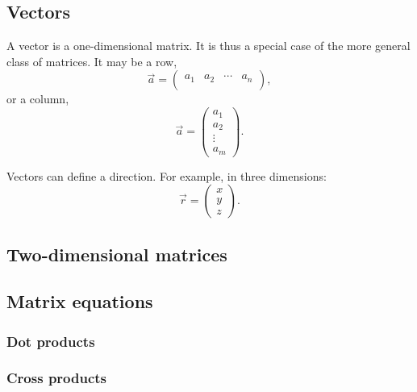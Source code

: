 \documentclass[a4paper,10pt]{scrartcl}
\begin{document}
\subsection{Vectors}

A vector is a one-dimensional matrix. It is thus a special case of the more general class of matrices. It may be a row,
\begin{equation}
\vec{a} =
 \begin{pmatrix}
  a_{1} & a_{2} & \cdots & a_{n} \\
 \end{pmatrix},
\end{equation}
or a column,
\begin{equation}
\vec{a} =
 \begin{pmatrix}
  a_{1} \\
  a_{2} \\
  \vdots \\
  a_{m}
 \end{pmatrix}.
\end{equation}

Vectors can define a direction. For example, in three dimensions:
\begin{equation}
\vec{r} =
 \begin{pmatrix}
  x \\
  y \\
  z
 \end{pmatrix}.
\end{equation}

\subsection{Two-dimensional matrices}



\subsection{Matrix equations}



\subsubsection{Dot products}



\subsubsection{Cross products}
\end{document}
